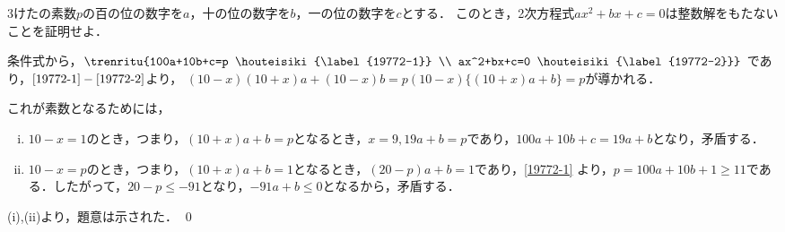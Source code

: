 
\begin{problem}
  3けたの素数$p$の百の位の数字を$a$，十の位の数字を$b$，一の位の数字を$c$とする．
このとき，2次方程式$ax^2+bx+c=0$は整数解をもたないことを証明せよ．
\end{problem}

条件式から，$\trenritu{%
  100a+10b+c=p \houteisiki{\label{19772-1}} \\
  ax^2+bx+c=0 \houteisiki{\label{19772-2}}%
}$
であり，$\eqref{19772-1}-\eqref{19772-2}$より，
$(10-x)(10+x)a + (10-x)b = p$\qquad $(10-x)\{(10+x)a+b\}=p$が導かれる．

これが素数となるためには，
\begin{enumerate}[(i)]
  \item $10-x =1$のとき，つまり，$(10+x)a+b=p$となるとき，$x=9, 19a+b=p$であり，$100a+10b+c=19a+b$となり，矛盾する．
  \item $10-x=p$のとき，つまり，$(10+x)a+b=1$となるとき，$(20-p)a+b=1$であり，\eqref{19772-1} より，$p=100a+10b+1 \geq 11$である．したがって，$20-p \leq -91$となり，$-91a + b \leq 0$となるから，矛盾する．
\end{enumerate}
(i),(ii)より，題意は示された．
\qed
